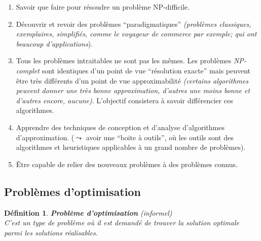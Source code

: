 \documentclass[12pt]{article}
\newtheorem{de}{D\'efinition}[section]
\begin{document}
\begin{enumerate}
	\item Savoir que faire pour résoudre un problème NP-difficile.
	\item Découvrir et revoir des problèmes ``paradigmatiques'' \textit{(problèmes
		classiques, exemplaires, simplifiés, comme le voyageur de commerce par exemple;
		qui ont beaucoup d'applications}).
	\item Tous les problèmes intraitables ne sont pas les mêmes. Les problèmes
		\textit{NP-complet} sont identiques d'un point de vue ``résolution exacte'' mais
		peuvent être très différents d'un point de vue approximabilité
		\textit{(certains algorithmes peuvent donner une très bonne approximation,
		d'autres une moins bonne et d'autres encore, aucune)}. L'objectif consistera à
		savoir différencier ces algorithmes.
	\item Apprendre des techniques de conception et d'analyse d'algorithmes
		d'approximation. ($\leadsto$ avoir une ``boite à outils'', où les outils sont
		des algorithmes et heuristiques applicables à un grand nombre de problèmes).
	\item \^Etre capable de relier des nouveaux problèmes à des problèmes
		connus.
\end{enumerate}

\subsection{Problèmes d'optimisation}

\begin{de} \textbf{Problème d'optimisation} (informel) \\
C'est un type de problème où il est demandé de trouver la solution optimale
parmi les solutions réalisables.
\end{de}
\end{document}
